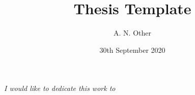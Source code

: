 \documentclass[11pt, a4paper, twoside, openright]{custard}
\begin{document}
	
	\title{Thesis Template}
	\author{A. N. Other}
	
	
	
	\date{30th September 2020}
	
	\frontmatter
	\maketitle
	\declaration
	\cleardoublepage
	
	\ifdraftdoc\else
	\begin{vplace}[0.7]
		\begin{large}
			\begin{center}
				\textit{I would like to dedicate this work to\edots}
			\end{center}
		\end{large}
	\end{vplace}
	\fi
\end{document}
